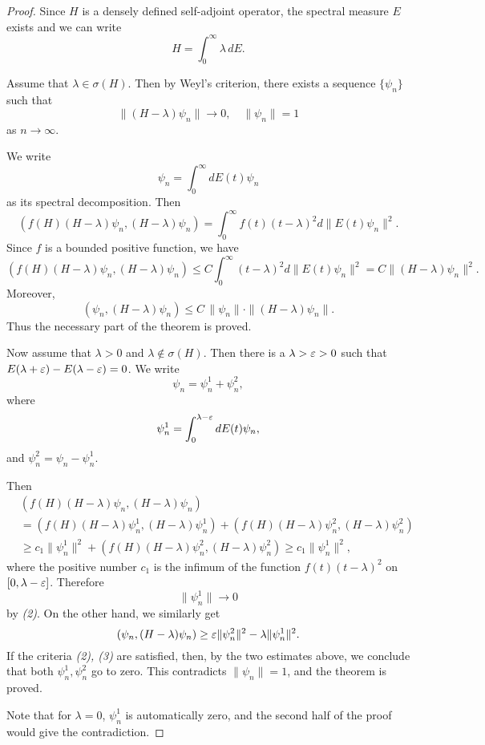 \begin{proof} Since $H$ is a densely defined self-adjoint operator, the spectral measure $E$ exists and we can write
\begin{equation}\label{decomp}
H=\int_0^\infty \lambda\, dE.
\end{equation}

\noindent Assume that $\lambda\in\sigma(H)$. Then by Weyl's criterion, there exists a sequence $\{\psi_n\}$ such that
\[
\|(H-\lambda)\psi_n\|\to 0, \quad \|\psi_n\|=1
\]
as $n\to\infty$.

\noindent We write
\[
\psi_n=\int_0^\infty d E(t)\psi_n
\]
as its spectral decomposition. Then
\[
(f(H) (H-\lambda)\psi_n, (H-\lambda)\psi_n)=\int_0^\infty f(t)(t-\lambda)^2 d\|E(t)\psi_n\|^2.
\]
Since $f$ is a bounded positive function, we have
\[
(f(H) (H-\lambda)\psi_n, (H-\lambda)\psi_n)\leq C\int_0^\infty (t-\lambda)^2 d\|E(t)\psi_n\|^2=C\|(H-\lambda)\psi_n\|^2.
\]
Moreover,
\[
(\psi_n, (H-\lambda)\psi_n)\leq C\,\|\psi_n\|\cdot\|(H-\lambda)\psi_n\|.
\]
Thus the necessary part of the theorem is proved.

Now assume that $\lambda>0$ and $\lambda\notin\sigma(H)$. Then there is a $\lambda>\varepsilon>0$ such that $E(\lambda+\varepsilon)-E(\lambda-\varepsilon)=0$. We write
\begin{equation}\label{fgh}
\psi_n=\psi_n^1+\psi_n^2,
\end{equation}
where
\[
\psi_n^1=\int_0^{\lambda-\varepsilon} dE(t)\psi_n,
\]
and $\psi_n^2=\psi_n-\psi_n^1$.

\noindent Then
\begin{align*}&
(f(H) (H-\lambda)\psi_n, (H-\lambda)\psi_n) \\
&=(f(H) (H-\lambda)\psi_n^1, (H-\lambda)\psi_n^1)
+(f(H) (H-\lambda)\psi^2_n, (H-\lambda)\psi_n^2)\\
& \geq c_1\|\psi_n^1\|^2+(f(H) (H-\lambda)\psi^2_n, (H-\lambda)\psi_n^2)\geq c_1\|\psi_n^1\|^2,
\end{align*}
where the positive number $c_1$ is the infimum of the function $f(t)(t-\lambda)^2$ on $[0,\lambda-\varepsilon]$.
Therefore
\[
\|\psi_n^1\|\to 0
\]
by {\it (2)}. On the other hand, we similarly get
\[
(\psi_n, (H-\lambda)\psi_n)\geq \varepsilon\|\psi_n^2\|^2-\lambda\|\psi_n^1\|^2.
\]
If the criteria {\it (2), (3)} are satisfied, then, by the two {estimates} above, we conclude that both $\psi_n^1, \psi_n^2$ go to zero. This   contradicts $\|\psi_n\|=1$, and the theorem is proved.

\noindent Note that for $\lambda=0$, $\psi_n^1$ is automatically zero, and the second half of the proof would give the contradiction.

\end{proof}

